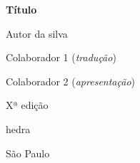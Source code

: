 




\begingroup\thispagestyle{empty}\vspace*{.05\textheight} 
\parindent0pt
              \formular
              \Huge
              \noindent
              \textbf{Título}

              {\brabo\LARGE
              \noindent Autor da silva}
              
              \vfill

  \newfontfamily{}
              \fontsize{30}{40}\selectfont \minion\small
              \noindent Colaborador 1 (\textit{tradução})
              \vspace{0.1cm}

              \noindent Colaborador 2 (\textit{apresentação})

              \vspace{0.5cm}
              
              {\noindent\fontsize{30}{40}\selectfont \minion\small\noindent Xª edição}

              \vfill

              \newfontfamily{}
              {\noindent\fontsize{30}{40}\selectfont\timesnewroman hedra}
              \smallskip
              
              {\selectfont\minion\small
              \noindent São Paulo \quad\the\year}

\endgroup
\pagebreak
